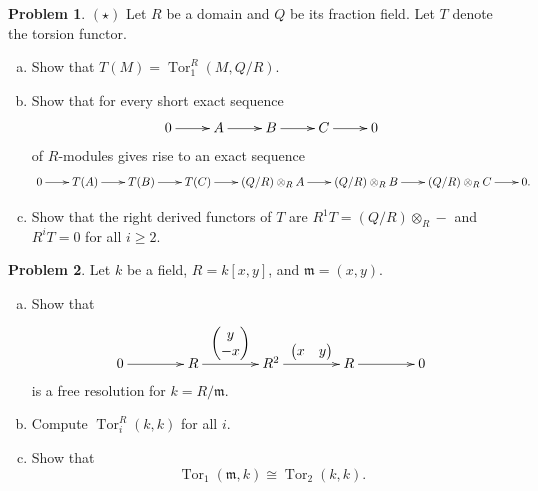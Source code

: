 \documentclass[11pt]{article}
\DeclareMathOperator{\Tor}{Tor}
\newcommand{\m}{\mathfrak{m}}
\theoremstyle{definition}
\newtheorem{problem}{Problem}
\begin{document}
\vfill


\begin{problem}
	$(\star)$ Let $R$ be a domain and $Q$ be its fraction field. Let $T$ denote the torsion functor. 
	\begin{enumerate}[a)]
		\item Show that $T(M) = \Tor_1^R(M,Q/R)$.
		\item Show that for every short exact sequence
	$$\xymatrix{0 \ar[r] & A \ar[r] & B \ar[r] & C \ar[r] & 0}$$
	of $R$-modules gives rise to an exact sequence
	$$\xymatrix@C=7mm{0 \ar[r] & T(A) \ar[r] & T(B) \ar[r] & T(C) \ar[r] & (Q/R) \otimes_R A \ar[r] & (Q/R) \otimes_R B \ar[r] & (Q/R) \otimes_R C \ar[r] & 0.}$$
	\item Show that the right derived functors of $T$ are $R^1T = (Q/R) \otimes_R -$ and $R^iT = 0$ for all $i \geqslant 2$.	
	\end{enumerate}
	\end{problem}
	
	

\vfill

\begin{problem}
	Let $k$ be a field, $R = k[x,y]$, and $\m = (x,y)$.
	\begin{enumerate}[a)]
		\item Show that
		$$\xymatrix@C=14mm{0 \ar[r] & R \ar[r]^-{\begin{pmatrix}
			y \\ -x
		\end{pmatrix}} & R^2 \ar[r]^-{\begin{pmatrix}
			x & y
		\end{pmatrix}} & R \ar[r] & 0}$$
		is a free resolution for $k = R/\m$.
		\item Compute $\Tor_i^R(k,k)$ for all $i$.
		\item Show that
		$$\Tor_1(\m,k) \cong \Tor_2(k,k).$$
	\end{enumerate}
\end{problem}
	
\vfill
	
	
\end{document}

